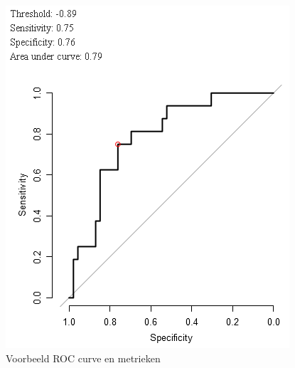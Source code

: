 \begin{figure}
	\centering
	\includegraphics[scale=.7]{images/roc_curve}
	\caption{Voorbeeld ROC curve en metrieken}
	\label{fig:D:evaluation-roc}
\end{figure}

